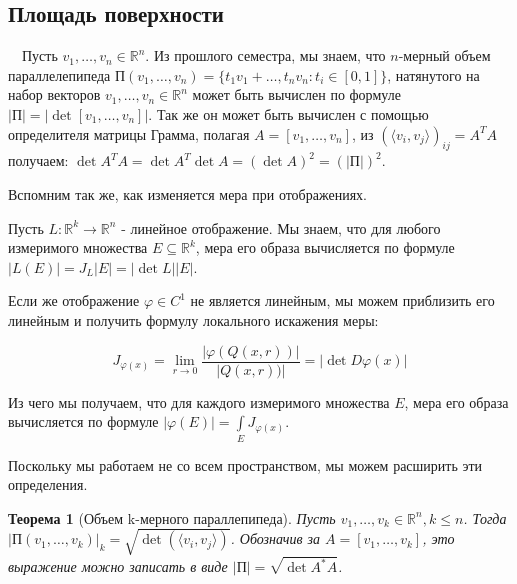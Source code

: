 \documentclass[a5paper]{article}
\newcounter{through}
\theoremstyle{plain}
\newtheorem{theorem}[through]{Теорема}
\theoremstyle{definition}
\numberwithin{through}{section}
\numberwithin{equation}{section}
\begin{document}

\subsection{Площадь поверхности}

~~Пусть $v_1, \ldots, v_n \in \mathbb{R}^n$. 
Из прошлого семестра, мы знаем, что $n$-мерный объем параллелепипеда
 $\text{П} (v_1, \ldots, v_n)= \{ t_1 v_1 + \ldots, t_n v_n : t_i \in [0, 1] \}$, 
 натянутого на набор векторов $v_1, \ldots, v_n \in \mathbb{R}^n$ может быть вычислен по формуле 
 $|\text{П}| = | \det [v_1, \ldots, v_n] |$. 
 Так же он может быть вычислен с помощью определителя матрицы Грамма, полагая 
 $A = [v_1, \ldots, v_n]$, из $(\langle v_i, v_j \rangle)_{ij}=A^{T}A$ получаем:
  $\det A^{T}A = \det A^T \det A = (\det A)^2 = (| \text{П} |)^2$.

Вспомним так же, как изменяется мера при отображениях.

Пусть $L : \mathbb{R}^k \to \mathbb{R}^n$ - линейное отображение. Мы знаем, что для любого измеримого множества $E \subseteq \mathbb{R}^k$, мера его образа вычисляется по формуле $| L(E) | = J_L | E | = | \det L | | E |$.

Если же отображение $\varphi \in C^1$ не является линейным, мы можем приблизить его линейным и получить формулу локального искажения меры:

\begin{equation*}
J_{\varphi(x)} = \lim\limits_{r \to 0} \frac{| \varphi(Q(x,r) ) |}{| Q(x,r)) |} = | \det D \varphi(x) |
\end{equation*}

Из чего мы получаем, что для каждого измеримого множества $E$, мера его образа вычисляется по формуле $| \varphi(E) | = \int\limits_{E} J_{\varphi(x)}$.

Поскольку мы работаем не со всем пространством, мы можем расширить эти определения.

\begin{theorem}[Объем k-мерного параллепипеда]
	Пусть $v_1, \ldots, v_k \in \mathbb{R}^n, k \leq n$. Тогда $| \text{П} (v_1, \ldots, v_k) |_k = \sqrt{\det(\langle v_i, v_j \rangle)}$. Обозначив за $A = [v_1, \ldots, v_k]$, это выражение	 можно записать в виде $| \text{П} | = \sqrt{\det A^* A}$.
\end{theorem}
\end{document}

